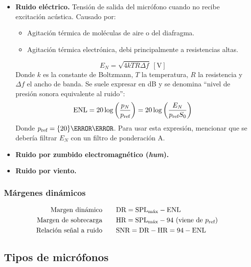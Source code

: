 \documentclass[a4paper, 8pt]{extarticle}
\begin{document}
\begin{multicols}{3}
  \begin{itemize}
    \item \textbf{Ruido eléctrico.} Tensión de salida del micrófono cuando no recibe excitación acústica. Causado por:
          \begin{itemize}
            \item Agitación térmica de moléculas de aire o del diafragma.
            \item Agitación térmica electrónica, debi principalmente a resistencias altas.
          \end{itemize}
          \[ E_N = \sqrt{4kTR \Delta f} \ \left[ \unit{\volt }  \right]\]
          Donde $k$ es la constante de Boltzmann, $T$ la temperatura, $R$ la resistencia y $\Delta f$ el ancho de banda. Se suele expresar en \unit{\dB_{}} y se denomina ``nivel de presión sonora equivalente al ruido'':
          \[ \text{ENL} = 20 \log \left( \frac{p_N}{p _{\textnormal{ref}}} \right)  = 20 \log \left( \frac{E_N}{p _{\textnormal{ref}}S_0} \right) \]
          Donde $p _{\textnormal{ref}} = \qty{20}{\micro\pascal }$. Para usar esta expresión, mencionar que se debería filtrar $E_N$ con un filtro de ponderación A.
    \item \textbf{Ruido por zumbido electromagnético (\textit{hum}).}
    \item \textbf{Ruido por viento.}
  \end{itemize}

  \subsubsection{Márgenes dinámicos}

  \begin{align*}
    \text{Margen dinámico}        & \qquad \text{DR} = \text{SPL}_{\text{máx}} - \text{ENL}                                    \\
    \text{Margen de sobrecarga}   & \qquad \text{HR} = \text{SPL}_{\text{máx}} - 94 \ (\text{viene de } p _{\textnormal{ref}}) \\
    \text{Relación señal a ruido} & \qquad \text{SNR} = \text{DR} - \text{HR} = 94 - \text{ENL}
  \end{align*}
  \subsection{Tipos de micrófonos}

\end{multicols}
\end{document}

